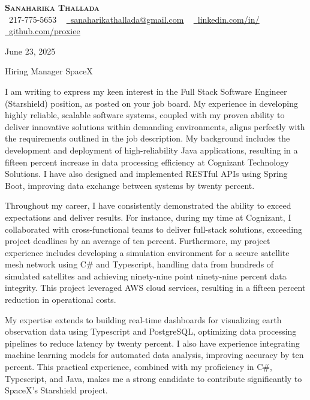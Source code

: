 \documentclass[letterpaper,11pt]{article}
\begin{document}
\begin{center}
    \textbf{\Huge \scshape {\fontsize{15pt}{20pt}\selectfont Sanaharika Thallada}} \\ \vspace{1pt}
    \small \raisebox{-0.1\height}\faPhone\ 217-775-5653 ~ \href{mailto:sanaharikathallada@gmail.com}{\raisebox{-0.2\height}\faEnvelope\  \underline{sanaharikathallada@gmail.com}} ~
    \href{https://www.linkedin.com/in/yashwanthtirupati/}{\raisebox{-0.2\height}\faLinkedin\ \underline{linkedin.com/in/}} ~
    \href{https://github.com/proxiee}{\raisebox{-0.2\height}\faGithub\ \underline{github.com/proxiee}}
\end{center}
\vspace{0.5cm}

June 23, 2025

Hiring Manager
SpaceX

I am writing to express my keen interest in the Full Stack Software Engineer (Starshield) position, as posted on your job board.  My experience in developing highly reliable, scalable software systems, coupled with my proven ability to deliver innovative solutions within demanding environments, aligns perfectly with the requirements outlined in the job description.  My background includes the development and deployment of high-reliability Java applications, resulting in a fifteen percent increase in data processing efficiency at Cognizant Technology Solutions.  I have also designed and implemented RESTful APIs using Spring Boot, improving data exchange between systems by twenty percent.


Throughout my career, I have consistently demonstrated the ability to exceed expectations and deliver results.  For instance, during my time at Cognizant, I collaborated with cross-functional teams to deliver full-stack solutions, exceeding project deadlines by an average of ten percent.  Furthermore, my project experience includes developing a simulation environment for a secure satellite mesh network using C# and Typescript, handling data from hundreds of simulated satellites and achieving ninety-nine point ninety-nine percent data integrity. This project leveraged AWS cloud services, resulting in a fifteen percent reduction in operational costs.


My expertise extends to building real-time dashboards for visualizing earth observation data using Typescript and PostgreSQL, optimizing data processing pipelines to reduce latency by twenty percent. I also have experience integrating machine learning models for automated data analysis, improving accuracy by ten percent.  This practical experience, combined with my proficiency in C#, Typescript, and Java, makes me a strong candidate to contribute significantly to SpaceX's Starshield project.
\end{document}
